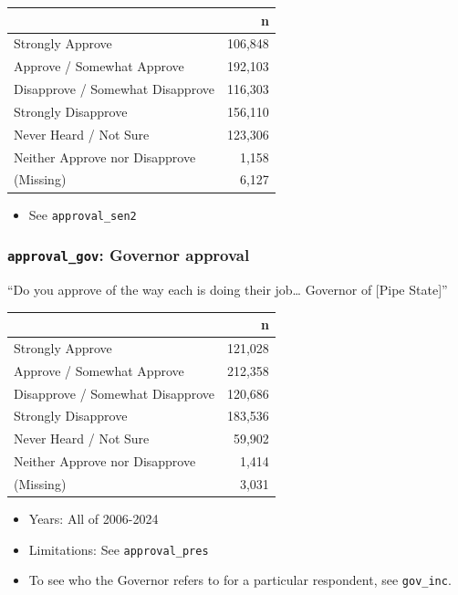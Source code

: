 \documentclass[10pt,article,oneside]{memoir}
\begin{document}
\begin{table}[H]
\centering
\begin{tabular}[t]{lr}
\toprule
 & n\\
\midrule
Strongly Approve & 106,848\\
Approve / Somewhat Approve & 192,103\\
Disapprove / Somewhat Disapprove & 116,303\\
Strongly Disapprove & 156,110\\
Never Heard / Not Sure & 123,306\\
Neither Approve nor Disapprove & 1,158\\
(Missing) & 6,127\\
\bottomrule
\end{tabular}
\end{table}

\begin{itemize}
\tightlist
\item
  See \texttt{approval\_sen2}
\end{itemize}

\subsubsection{\texorpdfstring{\texttt{approval\_gov}: Governor
approval}{approval\_gov: Governor approval}}\label{approval_gov-governor-approval}

``Do you approve of the way each is doing their job\ldots{} Governor of
{[}Pipe State{]}''

\begin{table}[H]
\centering
\begin{tabular}[t]{lr}
\toprule
 & n\\
\midrule
Strongly Approve & 121,028\\
Approve / Somewhat Approve & 212,358\\
Disapprove / Somewhat Disapprove & 120,686\\
Strongly Disapprove & 183,536\\
Never Heard / Not Sure & 59,902\\
Neither Approve nor Disapprove & 1,414\\
(Missing) & 3,031\\
\bottomrule
\end{tabular}
\end{table}

\begin{itemize}
\tightlist
\item
  Years: All of 2006-2024
\item
  Limitations: See \texttt{approval\_pres}
\item
  To see who the Governor refers to for a particular respondent, see
  \texttt{gov\_inc}.
\end{itemize}
\end{document}
